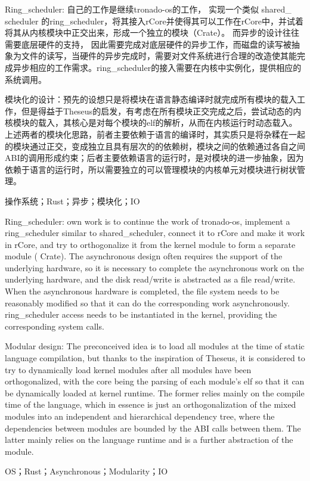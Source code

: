 \setlength{\headheight}{1.5cm}

\abstractcn

Ring\_scheduler: 自己的工作是继续tronado-os的工作， 实现一个类似 shared\_ scheduler 的ring\_scheduler，将其接入rCore并使得其可以工作在rCore中，并试着将其从内核模块中正交出来，形成一个独立的模块（Crate）。 而异步的设计往往需要底层硬件的支持， 因此需要完成对底层硬件的异步工作，而磁盘的读写被抽象为文件的读写，当硬件的异步完成时，需要对文件系统进行合理的改造使其能完成异步相应的工作需求。ring\_scheduler的接入需要在内核中实例化，提供相应的系统调用。

模块化的设计：预先的设想只是将模块在语言静态编译时就完成所有模块的载入工作，但是得益于Theseus的启发，有考虑在所有模块正交完成之后，尝试动态的内核模块的载入，其核心是对每个模块的elf的解析，从而在内核运行时动态载入。上述两者的模块化思路，前者主要依赖于语言的编译时，其实质只是将杂糅在一起的模块通过正交，变成独立且具有层次的的依赖树，模块之间的依赖通过各自之间ABI的调用形成约束；后者主要依赖语言的运行时，是对模块的进一步抽象，因为依赖于语言的运行时，所以需要独立的可以管理模块的内核单元对模块进行树状管理。

\keywordscn\quad 操作系统；Rust；异步；模块化；IO
\abstracten

Ring\_scheduler: own work is to continue the work of tronado-os, implement a ring\_scheduler similar to shared\_scheduler, connect it to rCore and make it work in rCore, and try to orthogonalize it from the kernel module to form a separate module ( Crate). The asynchronous design often requires the support of the underlying hardware, so it is necessary to complete the asynchronous work on the underlying hardware, and the disk read/write is abstracted as a file read/write. When the asynchronous hardware is completed, the file system needs to be reasonably modified so that it can do the corresponding work asynchronously. ring\_scheduler access needs to be instantiated in the kernel, providing the corresponding system calls.

Modular design: The preconceived idea is to load all modules at the time of static language compilation, but thanks to the inspiration of Theseus, it is considered to try to dynamically load kernel modules after all modules have been orthogonalized, with the core being the parsing of each module's elf so that it can be dynamically loaded at kernel runtime. The former relies mainly on the compile time of the language, which in essence is just an orthogonalization of the mixed modules into an independent and hierarchical dependency tree, where the dependencies between modules are bounded by the ABI calls between them. The latter mainly relies on the language runtime and is a further abstraction of the module.


\keywordsen\quad OS；Rust；Asynchronous；Modularity；IO